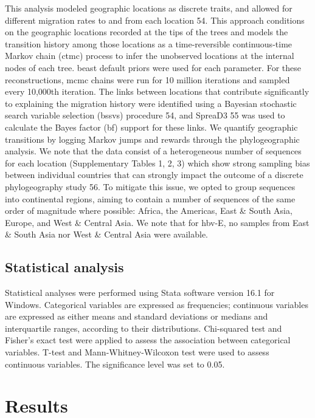 This analysis modeled geographic locations as discrete traits, and allowed for different migration rates to and from each location 54.
This approach conditions on the geographic locations recorded at the tips of the trees and models the transition history among those locations as a time-reversible continuous-time Markov chain (\gls{ctmc}) process to infer the unobserved locations at the internal nodes of each tree.
\gls{beast} default priors were used for each parameter. For these reconstructions, \gls{mcmc} chains were run for 10 million iterations and sampled every 10,000th iteration.
The links between locations that contribute significantly to explaining the migration history were identified using a Bayesian stochastic search variable selection (\gls{bssvs}) procedure 54, and SpreaD3 55 was used to calculate the Bayes factor (\gls{bf}) support for these links.
We quantify geographic transitions by logging Markov jumps and rewards through the phylogeographic analysis. We note that the data consist of a heterogeneous number of sequences for each location (Supplementary Tables 1, 2, 3) which show strong sampling bias between individual countries that can strongly impact the outcome of a discrete phylogeography study 56.
To mitigate this issue, we opted to group sequences into continental regions, aiming to contain a number of sequences of the same order of magnitude where possible: Africa, the Americas, East \& South Asia, Europe, and West \& Central Asia.
We note that for \gls{hbv}-E, no samples from East \& South Asia nor West \& Central Asia were available.

\subsection{Statistical analysis}
Statistical analyses were performed using Stata software version 16.1 for Windows. Categorical variables are expressed as frequencies; continuous variables are expressed as either means and standard deviations or medians and interquartile ranges, according to their distributions. Chi-squared test and Fisher's exact test were applied to assess the association between categorical variables. T-test and Mann-Whitney-Wilcoxon test were used to assess continuous variables. The significance level was set to 0.05.

\section{Results}
